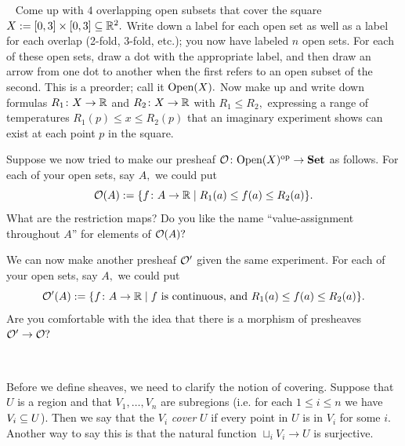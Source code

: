 \documentclass[CT4S-EN-RU]{subfiles}
\begin{document}
\begin{exerciseENG}~
\sexc Come up with $4$ overlapping open subsets that cover the square $X:=[0,3]\times[0,3]\ss\RR^2.$ Write down a label for each open set as well as a label for each overlap (2-fold, 3-fold, etc.); you now have labeled $n$ open sets. For each of these open sets, draw a dot with the appropriate label, and then draw an arrow from one dot to another when the first refers to an open subset of the second. This is a preorder; call it $\Op(X).$ Now make up and write down formulas $R_1\taking X\to\RR$ and $R_2\taking X\to\RR$ with $R_1\leq R_2,$ expressing a range of temperatures $R_1(p)\leq x\leq R_2(p)$ that an imaginary experiment shows can exist at each point $p$ in the square. 
\item Suppose we now tried to make our presheaf $\mcO\taking\Op(X)\op\to\Set$ as follows. For each of your open sets, say $A,$ we could put $$\mcO(A):=\{f\taking A\to\RR\|R_1(a)\leq f(a)\leq R_2(a)\}.$$ What are the restriction maps? Do you like the name “value-assignment throughout $A$” for elements of $\mcO(A)?$ 
\item We can now make another presheaf $\mcO'$ given the same experiment. For each of your open sets, say $A,$ we could put $$\mcO'(A):=\{f\taking A\to\RR\|f\tn{ is continuous, and }R_1(a)\leq f(a)\leq R_2(a)\}.$$ Are you comfortable with the idea that there is a morphism of presheaves $\mcO'\to\mcO?$
\endsexc
\end{exerciseENG}

\begin{exerciseRUS}~
\end{exerciseRUS}

\begin{blockENG}
Before we define sheaves, we need to clarify the notion of covering. Suppose that $U$ is a region and that $V_1,\ldots,V_n$ are subregions (i.e. for each $1\leq i\leq n$ we have $V_i\ss U$). Then we say that the $V_i$ {\em cover} $U$ if every point in $U$ is in $V_i$ for some $i.$ Another way to say this is that the natural function $\sqcup_iV_i\to U$ is surjective.
\end{blockENG}

\begin{blockRUS}
\end{blockRUS}
\end{document}
